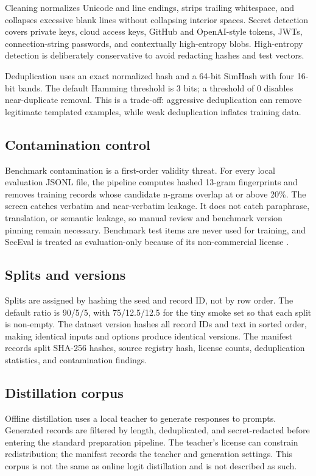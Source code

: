 Cleaning normalizes Unicode and line endings, strips trailing whitespace, and
collapses excessive blank lines without collapsing interior spaces. Secret
detection covers private keys, cloud access keys, GitHub and OpenAI-style
tokens, JWTs, connection-string passwords, and contextually high-entropy blobs.
High-entropy detection is deliberately conservative to avoid redacting hashes
and test vectors.

Deduplication uses an exact normalized hash and a 64-bit SimHash with four
16-bit bands. The default Hamming threshold is 3 bits; a threshold of 0 disables
near-duplicate removal. This is a trade-off: aggressive deduplication can remove
legitimate templated examples, while weak deduplication inflates training data.

\subsection{Contamination control}

Benchmark contamination is a first-order validity threat. For every local
evaluation JSONL file, the pipeline computes hashed 13-gram fingerprints and
removes training records whose candidate n-grams overlap at or above 20\%.
The screen catches verbatim and near-verbatim leakage. It does not catch
paraphrase, translation, or semantic leakage, so manual review and benchmark
version pinning remain necessary. Benchmark test items are never used for
training, and SecEval is treated as evaluation-only because of its
non-commercial license \citep{li2023seceval}.

\subsection{Splits and versions}

Splits are assigned by hashing the seed and record ID, not by row order. The
default ratio is 90/5/5, with 75/12.5/12.5 for the tiny smoke set so that each
split is non-empty. The dataset version hashes all record IDs and text in sorted
order, making identical inputs and options produce identical versions. The
manifest records split SHA-256 hashes, source registry hash, license counts,
deduplication statistics, and contamination findings.

\subsection{Distillation corpus}

Offline distillation uses a local teacher to generate responses to prompts.
Generated records are filtered by length, deduplicated, and secret-redacted
before entering the standard preparation pipeline. The teacher's license can
constrain redistribution; the manifest records the teacher and generation
settings. This corpus is not the same as online logit distillation and is not
described as such.

